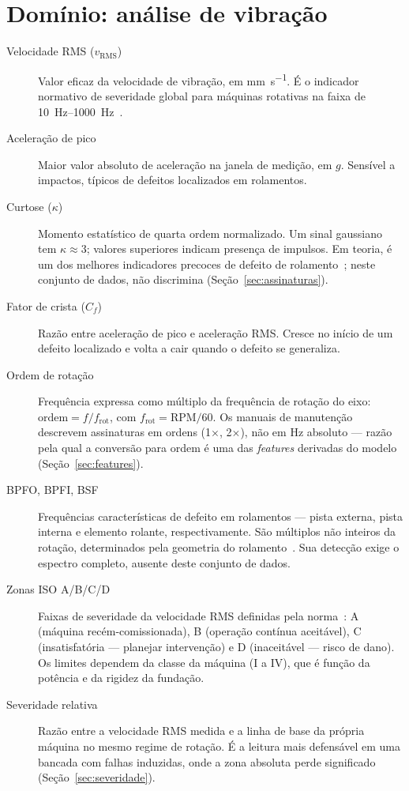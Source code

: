\section{Domínio: análise de vibração}

\begin{description}
  \item[Velocidade RMS ($v_{\text{RMS}}$)] Valor eficaz da velocidade de
    vibração, em \si{\milli\meter\per\second}. É o indicador normativo de
    severidade global para máquinas rotativas na faixa de
    \SIrange{10}{1000}{\hertz}~\cite{iso10816, iso20816}.

  \item[Aceleração de pico] Maior valor absoluto de aceleração na janela de
    medição, em $g$. Sensível a impactos, típicos de defeitos localizados em
    rolamentos.

  \item[Curtose ($\kappa$)] Momento estatístico de quarta ordem normalizado.
    Um sinal gaussiano tem $\kappa \approx 3$; valores superiores indicam
    presença de impulsos. Em teoria, é um dos melhores indicadores precoces de
    defeito de rolamento~\cite{randall2011tutorial}; neste conjunto de dados,
    não discrimina (Seção~\ref{sec:assinaturas}).

  \item[Fator de crista ($C_f$)] Razão entre aceleração de pico e aceleração
    RMS. Cresce no início de um defeito localizado e volta a cair quando o
    defeito se generaliza.

  \item[Ordem de rotação] Frequência expressa como múltiplo da frequência de
    rotação do eixo: $\text{ordem} = f / f_{\text{rot}}$, com
    $f_{\text{rot}} = \text{RPM}/60$. Os manuais de manutenção descrevem
    assinaturas em ordens (1$\times$, 2$\times$), não em \si{\hertz} absoluto ---
    razão pela qual a conversão para ordem é uma das \textit{features} derivadas
    do modelo (Seção~\ref{sec:features}).

  \item[BPFO, BPFI, BSF] Frequências características de defeito em rolamentos
    --- pista externa, pista interna e elemento rolante, respectivamente.
    São múltiplos não inteiros da rotação, determinados pela geometria do
    rolamento~\cite{randall2011tutorial}. Sua detecção exige o espectro
    completo, ausente deste conjunto de dados.

  \item[Zonas ISO A/B/C/D] Faixas de severidade da velocidade RMS definidas
    pela norma~\cite{iso10816}: A (máquina recém-comissionada), B (operação
    contínua aceitável), C (insatisfatória --- planejar intervenção) e D
    (inaceitável --- risco de dano). Os limites dependem da classe da máquina
    (I a IV), que é função da potência e da rigidez da fundação.

  \item[Severidade relativa] Razão entre a velocidade RMS medida e a linha de
    base da própria máquina no mesmo regime de rotação. É a leitura mais
    defensável em uma bancada com falhas induzidas, onde a zona absoluta perde
    significado (Seção~\ref{sec:severidade}).
\end{description}

